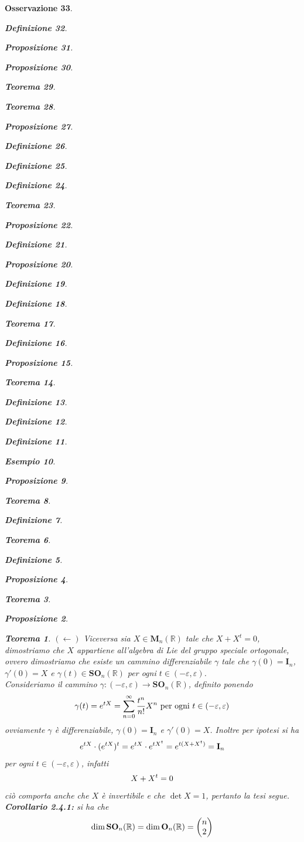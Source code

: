 \documentclass[oneside, 11pt]{amsbook}
\makeatletter
\newcommand{\0}{{(0)}}
\newcommand{\3}{{(3)}}
\theoremstyle{colonplain}
\newtheorem{thm}{Teorema}[chapter]
\newtheorem{prop}[thm]{Proposizione}
\theoremstyle{colondefinition}
\newtheorem{defn}[thm]{Definizione}
\newtheorem{ex}[thm]{Esempio}
\theoremstyle{colonremark}
\newtheorem{rmk}[thm]{Osservazione}
\numberwithin{equation}{chapter}
\renewcommand{\proofname}{Dimostrazione}
\renewenvironment{proof}[1][\proofname]{\par
  \pushQED{\end{proof}}%
  \normalfont \topsep6\p@\@plus6\p@\relax
  \trivlist
  \item[\hskip\labelsep\bfseries #1:]\ignorespaces
}{%
  \popQED\endtrivlist\@endpefalse
}
\makeatother
\begin{document}
\begin{rmk}
\begin{defn}
\begin{prop}
\begin{prop}
\begin{thm}
\begin{thm}
\begin{prop}
\begin{defn}
\begin{defn}
\begin{defn}
\begin{thm}
\begin{prop}
\begin{defn}
\begin{prop}
\begin{defn}
\begin{defn}
\begin{thm}
\begin{defn}
\begin{prop}
\begin{thm}
\begin{defn}
\begin{defn}
\begin{defn}
\begin{ex}
\begin{prop}
\begin{thm}
\begin{defn}
\begin{thm}
\begin{defn}
\begin{prop}
\begin{proof}
\begin{proof}
\begin{proof}
\begin{proof}
\begin{proof}[Soluzione]
\begin{proof}
\begin{proof}
\begin{thm}
\begin{prop}
\begin{thm}
\begin{proof}
$(\leftarrow)$ Viceversa sia $X \in \mathbf{M}_n(\mathbb{R})$ tale che $X + X^t = 0$, dimostriamo che $X$ appartiene all'algebra di Lie del gruppo speciale ortogonale, ovvero dimostriamo che esiste un cammino differenziabile $\gamma$ tale che $\gamma(0) = \mathbf{I}_n$, $\gamma'(0) = X$ e $\gamma(t) \in \mathbf{SO}_n(\mathbb{R})$ per ogni $t \in (-\varepsilon, \varepsilon)$. \\
Consideriamo il cammino $\gamma : (-\varepsilon, \varepsilon) \longrightarrow \mathbf{SO}_n(\mathbb{R})$, definito ponendo
\begin{align}
    \gamma(t) = e^{tX} = \sum_{n = 0}^\infty \frac{t^n}{n!}X^n \text{ per ogni } t \in (-\varepsilon, \varepsilon) \notag
\end{align}
ovviamente $\gamma$ è differenziabile, $\gamma(0) = \mathbf{I}_n$ e $\gamma'(0) = X$. Inoltre per ipotesi si ha
\begin{align}
    e^{tX} \cdot (e^{tX})^t = e^{tX} \cdot e^{tX^t} = e^{t(X + X^t)} = \mathbf{I}_n \notag
\end{align}
per ogni $t \in (-\varepsilon, \varepsilon)$, infatti
\begin{align}
    X + X^t = 0 \notag
\end{align}
ciò comporta anche che $X$ è invertibile e che $\det X = 1$, pertanto la tesi segue. \end{proof}
\textbf{Corollario 2.4.1:} si ha che
\begin{align}
    \dim \mathbf{SO}_n(\mathbb{R}) = \dim \mathbf{O}_n(\mathbb{R}) = \begin{pmatrix}
        n \\
        2
    \end{pmatrix} \notag
\end{align}


\end{thm}
\end{prop}
\end{thm}
\end{proof}
\end{proof}
\end{proof}
\end{proof}
\end{proof}
\end{proof}
\end{proof}
\end{prop}
\end{defn}
\end{thm}
\end{defn}
\end{thm}
\end{prop}
\end{ex}
\end{defn}
\end{defn}
\end{defn}
\end{thm}
\end{prop}
\end{defn}
\end{thm}
\end{defn}
\end{defn}
\end{prop}
\end{defn}
\end{prop}
\end{thm}
\end{defn}
\end{defn}
\end{defn}
\end{prop}
\end{thm}
\end{thm}
\end{prop}
\end{prop}
\end{defn}
\end{rmk}
\end{document}
